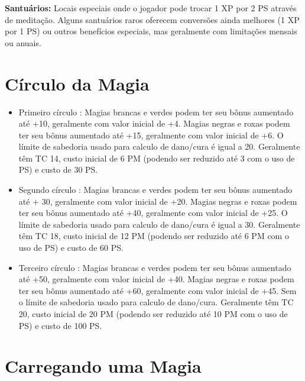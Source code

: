 \textbf{Santuários:}
Locais especiais onde o jogador pode trocar 1 XP por 2 PS através de meditação. Alguns santuários raros oferecem conversões ainda melhores (1 XP por 1 PS) ou outros benefícios especiais, mas geralmente com limitações mensais ou anuais.

\section{Círculo da Magia}

\begin{itemize}
 
	\item Primeiro círculo : Magias brancas e verdes podem ter seu bônus aumentado até +10, geralmente com valor inicial de +4. Magias negras e roxas podem ter seu bônus aumentado até +15, geralmente com valor inicial de +6. O límite de sabedoria usado para calculo de dano/cura é igual a 20. Geralmente têm TC 14, custo inicial de 6 PM (podendo ser reduzido até 3 com o uso de PS) e custo de 30 PS.

	\item Segundo círculo : Magias brancas e verdes podem ter seu bônus aumentado até + 30, geralmente com valor inicial de +20. Magias negras e roxas podem ter seu bônus aumentado até +40, geralmente com valor inicial de +25. O límite de sabedoria usado para calculo de dano/cura é igual a 30. Geralmente têm TC 18, custo inicial de 12 PM (podendo ser reduzido até 6 PM com o uso de PS) e custo de 60 PS.

    \item Terceiro círculo : Magias brancas e verdes podem ter seu bônus aumentado até +50, geralmente com valor inicial de +40. Magias negras e roxas podem ter seu bônus aumentado até +60, geralmente com valor inicial de +45. Sem o límite de sabedoria usado para calculo de dano/cura. Geralmente têm TC 20, custo inicial de 20 PM (podendo ser reduzido até 10 PM com o uso de PS) e custo de 100 PS.


\end{itemize}






\section{Carregando uma Magia}


